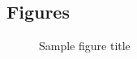 \documentclass{bmcart}
\begin{document}
\begin{backmatter}






\section*{Figures}
  \begin{figure}[h!]
  \caption{Sample figure title}
\end{figure}


\end{backmatter}
\end{document}
